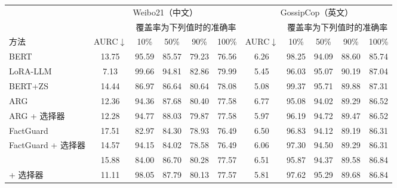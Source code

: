 \begin{tabular}{lcccccccccc}
\toprule
 & \multicolumn{5}{c}{Weibo21（中文）} & \multicolumn{5}{c}{GossipCop（英文）} \\
\cmidrule(lr){2-6}\cmidrule(lr){7-11}
 & & \multicolumn{4}{c}{覆盖率为下列值时的准确率} & & \multicolumn{4}{c}{覆盖率为下列值时的准确率} \\
\cmidrule(lr){3-6}\cmidrule(lr){8-11}
方法 & AURC$\downarrow$ & 10\% & 50\% & 90\% & 100\% & AURC$\downarrow$ & 10\% & 50\% & 90\% & 100\% \\
\midrule
BERT & 13.75 & 95.59 & 85.57 & 79.23 & 76.56 & 6.26 & 98.25 & 94.09 & 88.60 & 85.74 \\
LoRA-LLM & 7.13 & 99.66 & 94.81 & 82.86 & 79.99 & 5.45 & 96.03 & 95.07 & 90.19 & 87.04 \\
BERT+ZS & 14.44 & 86.97 & 86.64 & 80.64 & 78.08 & 5.08 & 99.37 & 95.71 & 89.88 & 87.31 \\
ARG & 12.36 & 94.36 & 87.68 & 80.40 & 77.58 & 6.77 & 95.08 & 94.02 & 89.29 & 86.52 \\
ARG + 选择器 & 12.28 & 94.77 & 88.03 & 79.87 & 77.58 & 5.97 & 96.19 & 94.72 & 89.47 & 86.52 \\
FactGuard & 17.51 & 82.97 & 84.30 & 78.93 & 76.49 & 6.50 & 96.83 & 94.12 & 89.19 & 86.31 \\
FactGuard + 选择器 & 14.57 & 94.15 & 84.02 & 78.58 & 76.49 & 6.06 & 97.30 & 94.50 & 89.29 & 86.31 \\
\method{} & 15.88 & 84.00 & 86.70 & 80.28 & 77.57 & 6.51 & 95.87 & 94.37 & 89.58 & 86.84 \\
\method{} + 选择器 & 11.11 & 98.05 & 87.79 & 80.13 & 77.57 & 5.81 & 97.62 & 95.29 & 89.68 & 86.84 \\
\bottomrule
\end{tabular}
